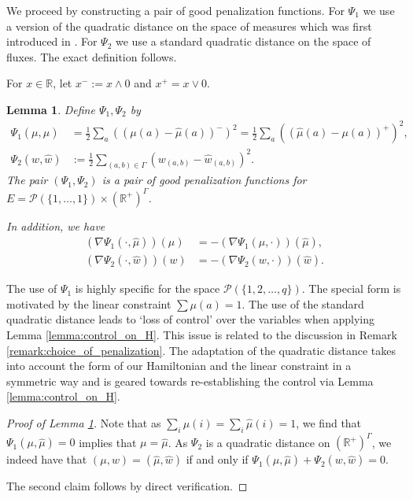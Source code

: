 \documentclass[a4paper]{article}
\newcommand{\cP}{\mathcal{P}}
\newcommand{\bR}{\mathbb{R}}
\numberwithin{equation}{section}
\newtheorem{lemma}[theorem]{Lemma}
\theoremstyle{definition}
\begin{document}
We proceed by constructing a pair of good penalization functions. For $\Psi_1$ we use a version of the quadratic distance on the space of measures which was first introduced in \cite{Kr16b}. For $\Psi_2$ we use a standard quadratic distance on the space of fluxes. The exact definition follows.


For $x \in \bR$, let $x^- := x \wedge 0$ and $x^+ = x \vee 0$.

\begin{lemma} \label{lemma:explicit_good_penalization_functions}
	Define $\Psi_1,\Psi_2$ by
	\begin{align*}
		\Psi_1(\mu,\hat{\mu}) & = \frac{1}{2} \sum_{a} ((\mu(a) - \hat{\mu}(a))^-)^2 = \frac{1}{2} \sum_{a} ((\hat{\mu}(a) - \mu(a))^+)^2, \\
		\Psi_2(w,\hat{w}) & := \frac{1}{2} \sum_{(a,b) \in \Gamma} (w_{(a,b)} - \hat{w}_{(a,b)})^2.
	\end{align*}
	The pair $(\Psi_1,\Psi_2)$ is a pair of good penalization functions for $E = \cP(\{1,\dots,1\}) \times (\bR^+)^{\Gamma}$.
	
	In addition, we have
	\begin{align*}
		(\nabla \Psi_1(\cdot,\hat{\mu}))(\mu) & = - (\nabla \Psi_1(\mu,\cdot))(\hat{\mu}), \\
		(\nabla \Psi_2(\cdot,\hat{w}))(w) & = - (\nabla \Psi_2(w,\cdot))(\hat{w}).
	\end{align*}
\end{lemma}

The use of $\Psi_1$ is highly specific for the space $\cP(\{1,2,\dots,q\})$.  The special form is motivated by the linear constraint $\sum \mu(a) = 1$. The use of the standard quadratic distance leads to `loss of control' over the variables when applying Lemma \ref{lemma:control_on_H}. This issue is related to the discussion in Remark \ref{remark:choice_of_penalization}.
The adaptation of the quadratic distance takes into account the form of our Hamiltonian and the linear constraint in a symmetric way and is geared towards re-establishing the control via Lemma \ref{lemma:control_on_H}. 

\begin{proof}[Proof of Lemma \ref{lemma:explicit_good_penalization_functions}]
	Note that as $\sum_i \mu(i) = \sum_i \hat{\mu}(i) = 1$, we find that $\Psi_1(\mu,\hat{\mu}) = 0$ implies that $\mu = \hat{\mu}$. As $\Psi_2$ is a quadratic distance on $(\bR^+)^\Gamma$, we indeed have that $(\mu,w) = (\hat{\mu},\hat{w})$ if and only if $\Psi_1(\mu,\hat{\mu}) + \Psi_2(w,\hat{w}) = 0$.
	
	The second claim follows by direct verification.
\end{proof}
\end{document}
